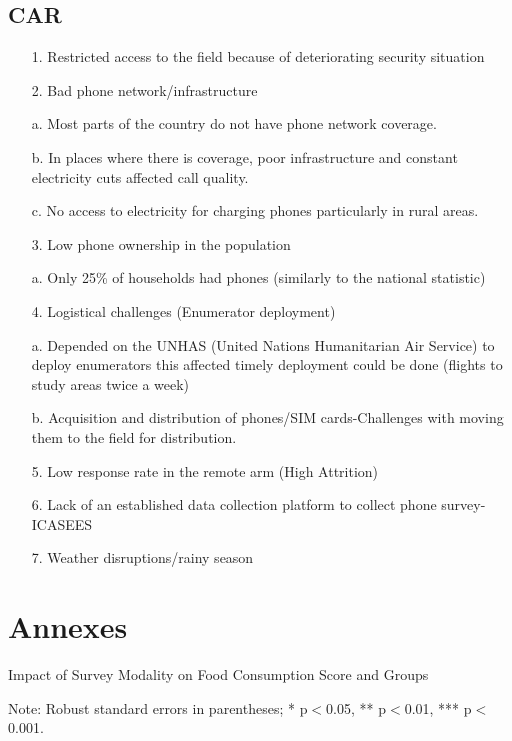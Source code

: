 \documentclass[11pt,harvard]{article}
\begin{document}
\subsection{CAR}

\begin{itemize}[label=--, left=1.5em]
	\item[1.] Restricted access to the field because of deteriorating security situation
	\item[2.] Bad phone network/infrastructure 
		\item[a.]	Most parts of the country do not have phone network coverage.
		\item[b.]	In places where there is coverage, poor infrastructure and constant electricity cuts affected call quality.
		\item[c.]	No access to electricity for charging phones particularly in rural areas.
	\item[3.] Low phone ownership in the population
		\item[a.] Only 25\% of households had phones (similarly to the national statistic)
	\item[4.] Logistical challenges (Enumerator deployment)
		\item[a.]	Depended on the UNHAS (United Nations Humanitarian Air Service) to deploy enumerators this affected timely deployment could be done (flights to study areas twice a week)
		\item[b.]	Acquisition and distribution of phones/SIM cards-Challenges with moving them to the field for distribution.
	\item[5.] Low response rate in the remote arm (High Attrition)
	\item[6.] Lack of an established data collection platform to collect phone survey-ICASEES 
	\item[7.] Weather disruptions/rainy season
\end{itemize}


\pagebreak


\section{Annexes}

\begin{table}[htbp]
	\centering
	\begin{adjustbox}{max width=\textwidth}
		\begin{threeparttable}
			\caption{Impact of Survey Modality on Food Consumption Score and Groups}
			\scriptsize
			 
			\label{tab:FCS_Modality_All_Country_Short}
			\begin{tablenotes}
				\item Note: Robust standard errors in parentheses; * p$<$0.05, ** p$<$0.01, *** p$<$0.001. 
			\end{tablenotes}
		\end{threeparttable}
	\end{adjustbox}
\end{table}
\end{document}
